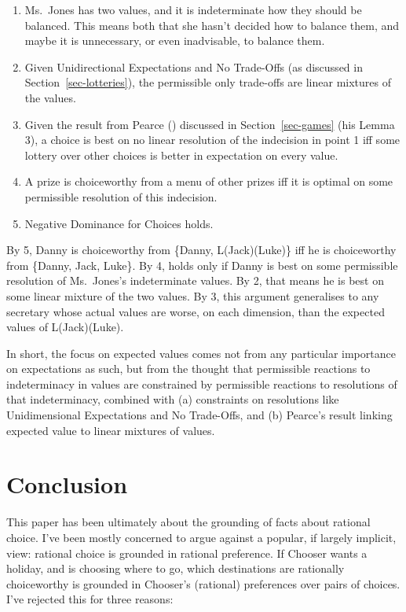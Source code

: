\documentclass[
  11pt,
  letterpaper,
  DIV=11,
  numbers=noendperiod,
  twoside]{scrartcl}
\providecommand{\tightlist}{%
  \setlength{\itemsep}{0pt}\setlength{\parskip}{0pt}}
\begin{document}
\begin{enumerate}
\def\labelenumi{\arabic{enumi}.}
\tightlist
\item
  Ms.~Jones has two values, and it is indeterminate how they should be
  balanced. This means both that she hasn't decided how to balance them,
  and maybe it is unnecessary, or even inadvisable, to balance them.
\item
  Given Unidirectional Expectations and No Trade-Offs (as discussed in
  Section~\ref{sec-lotteries}), the permissible only trade-offs are
  linear mixtures of the values.
\item
  Given the result from Pearce ()
  discussed in Section~\ref{sec-games} (his Lemma 3), a choice is best
  on no linear resolution of the indecision in point 1 iff some lottery
  over other choices is better in expectation on every value.
\item
  A prize is choiceworthy from a menu of other prizes iff it is optimal
  on some permissible resolution of this indecision.
\item
  Negative Dominance for Choices holds.
\end{enumerate}

By 5, Danny is choiceworthy from \{Danny, L(Jack)(Luke)\} iff he is
choiceworthy from \{Danny, Jack, Luke\}. By 4, holds only if Danny is
best on some permissible resolution of Ms.~Jones's indeterminate values.
By 2, that means he is best on some linear mixture of the two values. By
3, this argument generalises to any secretary whose actual values are
worse, on each dimension, than the expected values of L(Jack)(Luke).

In short, the focus on expected values comes not from any particular
importance on expectations as such, but from the thought that
permissible reactions to indeterminacy in values are constrained by
permissible reactions to resolutions of that indeterminacy, combined
with (a) constraints on resolutions like Unidimensional Expectations and
No Trade-Offs, and (b) Pearce's result linking expected value to linear
mixtures of values.

\section{Conclusion}\label{conclusion}

This paper has been ultimately about the grounding of facts about
rational choice. I've been mostly concerned to argue against a popular,
if largely implicit, view: rational choice is grounded in rational
preference. If Chooser wants a holiday, and is choosing where to go,
which destinations are rationally choiceworthy is grounded in Chooser's
(rational) preferences over pairs of choices. I've rejected this for
three reasons:
\end{document}
